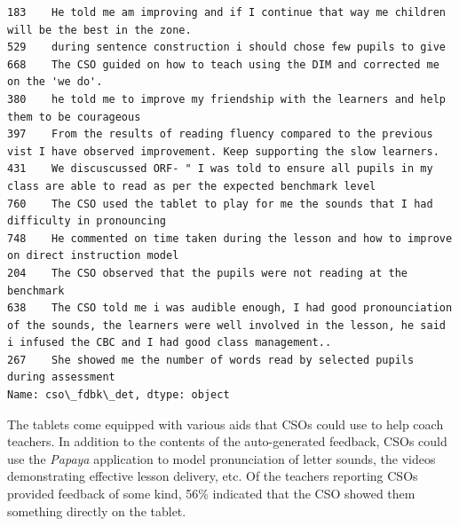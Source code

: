 \documentclass[11pt]{article}
\begin{document}
\begin{Verbatim}[commandchars=\\\{\}]
183    He told me am improving and if I continue that way me children will be the best in the zone.                                                                                             
529    during sentence construction i should chose few pupils to give                                                                                                                           
668    The CSO guided on how to teach using the DIM and corrected me on the 'we do'.                                                                                                            
380    he told me to improve my friendship with the learners and help them to be courageous                                                                                                     
397    From the results of reading fluency compared to the previous vist I have observed improvement. Keep supporting the slow learners.                                                        
431    We discuscussed ORF- " I was told to ensure all pupils in my class are able to read as per the expected benchmark level                                                                  
760    The CSO used the tablet to play for me the sounds that I had difficulty in pronouncing                                                                                                   
748    He commented on time taken during the lesson and how to improve on direct instruction model                                                                                              
204    The CSO observed that the pupils were not reading at the benchmark                                                                                                                       
638    The CSO told me i was audible enough, I had good pronounciation of the sounds, the learners were well involved in the lesson, he said i infused the CBC and I had good class management..
267    She showed me the number of words read by selected pupils during assessment                                                                                                              
Name: cso\_fdbk\_det, dtype: object

    \end{Verbatim}

    The tablets come equipped with various aids that CSOs could use to help
coach teachers. In addition to the contents of the auto-generated
feedback, CSOs could use the \emph{Papaya} application to model
pronunciation of letter sounds, the videos demonstrating effective
lesson delivery, etc. Of the teachers reporting CSOs provided feedback
of some kind, 56\% indicated that the CSO showed them something directly
on the tablet.
\end{document}
